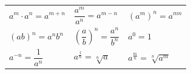 \begin{center}
\renewcommand{\arraystretch}{2.2}\setlength{\tabcolsep}{10pt}
\begin{tabular}{lll}
	$a^m \cdot a^n = a^{m+n}$ & $\dfrac{a^m}{a^n} = a^{m-n}$ & $(a^m)^n = a^{mn}$ \\
	$(ab)^n = a^n b^n$ & $\left(\dfrac{a}{b}\right)^n = \dfrac{a^n}{b^n}$ & $a^0 = 1$ \\
	$a^{-n} = \dfrac{1}{a^n}$ & $a^{\frac{1}{n}} = \sqrt[n]{a}$ & $a^{\frac{m}{n}} = \sqrt[n]{a^m}$ \\
\end{tabular}
\end{center}
